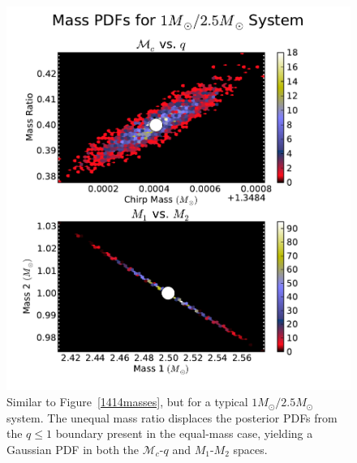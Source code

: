\documentclass[11pt,a4paper]{emulateapj} 
\newcommand{\chmass}{\mathcal{M}_c}
\begin{document}
\begin{figure}[h!]
  \centering \includegraphics[trim=1cm 0cm 2cm 0cm,
    clip=false,scale=0.63]{125masses2D.pdf}
 \caption{Similar to Figure~\ref{1414masses}, but for a typical
   $1M_{\odot}/2.5M_{\odot}$ system.  The unequal mass ratio displaces
   the posterior PDFs from the $q \leq 1$ boundary present in the equal-mass
   case, yielding a Gaussian PDF in both the $\chmass$-$q$ and
   $M_1$-$M_2$ spaces.}
  \label{125masses}
\end{figure}
\end{document}
